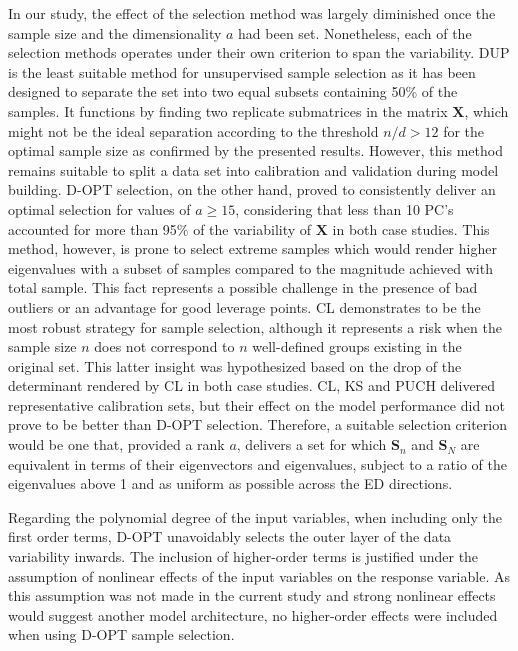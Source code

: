 \documentclass[preprint,12pt]{elsarticle}
\begin{document}
In our study, the effect of the selection method was largely diminished once the sample size and the dimensionality $a$ had been set. Nonetheless, each of the selection methods operates under their own criterion to span the variability. DUP is the least suitable method for unsupervised sample selection as it has been designed to separate the set into two equal subsets containing 50\% of the samples. It functions by finding two replicate submatrices in the matrix $\mathbf{X}$, which might not be the ideal separation according to the threshold $n/d>12$ for the optimal sample size as confirmed by the presented results. However, this method remains suitable to split a data set into calibration and validation during model building\cite{Aernouts2011}. D-OPT selection, on the other hand, proved to consistently deliver an optimal selection for values of $a \ge 15$, considering that less than 10 PC's accounted for more than 95\% of the variability of $\mathbf{X}$ in both case studies. This method, however, is prone to select extreme samples which would render higher eigenvalues with a subset of samples compared to the magnitude achieved with total sample. This fact represents a possible challenge in the presence of bad outliers or an advantage for good leverage points. CL demonstrates to be the most robust strategy for sample selection, although it represents a risk when the sample size $n$ does not correspond to $n$ well-defined groups existing in the original set. This latter insight was hypothesized based on the drop of the determinant rendered by CL in both case studies. CL, KS and PUCH delivered representative calibration sets, but their effect on the model performance did not prove to be better than D-OPT selection. Therefore, a suitable selection criterion would be one that, provided a rank $a$, delivers a set for which $\mathbf{S}_n$ and $\mathbf{S}_N$ are equivalent in terms of their eigenvectors and eigenvalues, subject to a ratio of the eigenvalues above 1 and as uniform as possible across the ED directions.

Regarding the polynomial degree of the input variables, when including only the first order terms, D-OPT unavoidably selects the outer layer of the data variability inwards. The inclusion of higher-order terms is justified under the assumption of nonlinear effects of the input variables on the response variable. As this assumption was not made in the current study and strong nonlinear effects would suggest another model architecture, no higher-order effects were included when using D-OPT sample selection.
\end{document}
